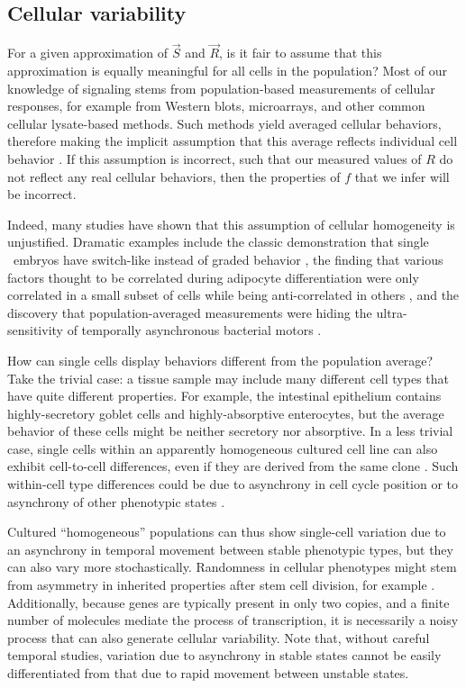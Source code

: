 \subsection{Cellular variability}
\label{introduction:variability}

For a given approximation of $\vec{S}$ and $\vec{R}$,
is it fair to assume that this approximation is equally meaningful
for all cells in the population? Most of our knowledge of signaling stems
from population-based measurements of cellular responses, for example from
Western blots, microarrays, and other common cellular lysate-based
methods. Such methods yield averaged cellular behaviors, therefore
making the implicit assumption that this average reflects individual
cell behavior \cite{Snijder2011,Altschuler2010,Huang2009}.
If this assumption is incorrect, such that our measured values of $R$
do not reflect any real cellular behaviors,
then the properties of $f$ that we infer will be incorrect.


Indeed, many studies have shown that this assumption of cellular homogeneity
is unjustified. Dramatic examples include the classic demonstration
that single \frog\ embryos have switch-like instead of graded
behavior \cite{Ferrell1998}, the finding that various factors thought to be correlated
during adipocyte differentiation were only correlated in a small
subset of cells while being anti-correlated in others \cite{Loo2009}, and the
discovery that
population-averaged measurements were hiding the ultra-sensitivity
of temporally asynchronous bacterial motors \cite{Cluzel2000}.


How can single cells display behaviors different from the population average?
Take the trivial case: a tissue sample may include many different cell types
that have quite different properties. For example, the intestinal
epithelium contains highly-secretory goblet cells and highly-absorptive
enterocytes, but the average behavior of these cells might be neither secretory nor
absorptive. In a less
trivial case, single cells within an apparently homogeneous
cultured cell line can also exhibit cell-to-cell differences,
even if they are derived from the same clone \cite{Singh2010}.
Such within-cell type differences could be due to asynchrony in cell cycle position
\cite{Sigal2006a} or to asynchrony of other phenotypic states
\cite{Kobayashi2009,Kalmar2009,Tay2010,Loo2009}.


Cultured ``homogeneous'' populations can thus show single-cell variation due to an
asynchrony in temporal movement between stable phenotypic types, but they
can also vary more stochastically. Randomness in cellular phenotypes
might stem from asymmetry in inherited properties after stem cell
division, for example \cite{Spencer2009,Navarro2012,Chang2008,Kalmar2009}. 
Additionally, because genes are
typically present in only two copies, and a finite number of molecules
mediate the process of transcription, it is necessarily a noisy
process \cite{Elowitz2002,Munsky2012,Sanchez2013} that can also generate
cellular variability. Note that, without careful temporal studies, variation
due to asynchrony in stable states cannot be easily differentiated from
that due to rapid movement between unstable states.


